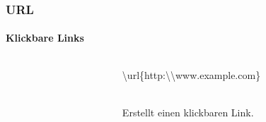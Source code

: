 
\begin{frame}
\frametitle{URL}
\framesubtitle{Klickbare Links}
\begin{columns}
\begin{column}{0.5\textwidth}
\begin{ttfamily}\scriptsize

\end{ttfamily}
\end{column}
\begin{column}{0.5\textwidth}
\begin{ttfamily}\color{nounibaredI}\textbackslash url\color{black}\{http:\textbackslash\textbackslash www.example.com\}\end{ttfamily}\\ 
Erstellt einen klickbaren Link.
\end{column}
\end{columns}
\end{frame}